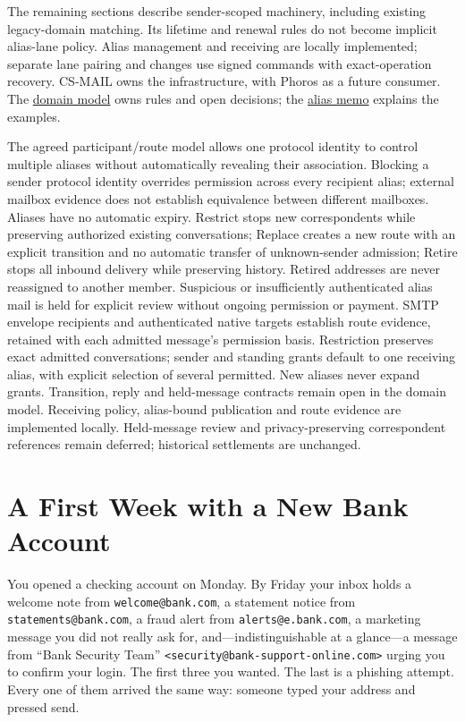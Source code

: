 \documentclass[11pt]{article}
\begin{document}
The remaining sections describe sender-scoped machinery, including existing
legacy-domain matching. Its lifetime and renewal rules do not become implicit
alias-lane policy. Alias management and receiving are locally implemented;
separate lane pairing and changes use signed commands with exact-operation recovery. CS-MAIL owns the
infrastructure, with Phoros as a future consumer. The
\href{DOMAIN_MODEL.md}{domain model} owns rules and open decisions; the
\href{cs_mail_aliases_and_express_lanes.tex}{alias memo} explains the examples.

The agreed participant/route model allows one protocol identity to control
multiple aliases without automatically revealing their association. Blocking a
sender protocol identity overrides permission across every recipient alias;
external mailbox evidence does not establish equivalence between different
mailboxes. Aliases have no automatic expiry. Restrict stops new
correspondents while preserving authorized existing conversations; Replace creates
a new route with an explicit transition and no automatic transfer of unknown-sender
admission; Retire stops all inbound delivery while preserving history. Retired
addresses are never reassigned to another member. Suspicious or insufficiently
authenticated alias mail is held for explicit review without ongoing
permission or payment. SMTP envelope recipients and authenticated native targets
establish route evidence, retained with each admitted message's permission basis.
Restriction preserves exact admitted conversations; sender and standing grants
default to one receiving alias, with explicit selection of several permitted.
New aliases never expand grants. Transition, reply and held-message contracts
remain open in the domain model. Receiving policy, alias-bound publication and route evidence are implemented locally.
Held-message review and privacy-preserving correspondent references remain deferred;
historical settlements are unchanged.

\section{A First Week with a New Bank Account}

{\sloppy
You opened a checking account on Monday. By Friday your inbox holds a welcome note
from \texttt{welcome@bank.com}, a statement notice from
\texttt{statements@bank.com}, a fraud alert from \texttt{alerts@e.bank.com}, a
marketing message you did not really ask for, and---indistinguishable at a
glance---a message from ``Bank Security Team''
\texttt{<security@\allowbreak bank-\allowbreak support-\allowbreak online.com>}
urging you to confirm your login. The
first three you wanted. The last is a phishing attempt. Every one of them arrived
the same way: someone typed your address and pressed send.\par}
\end{document}
